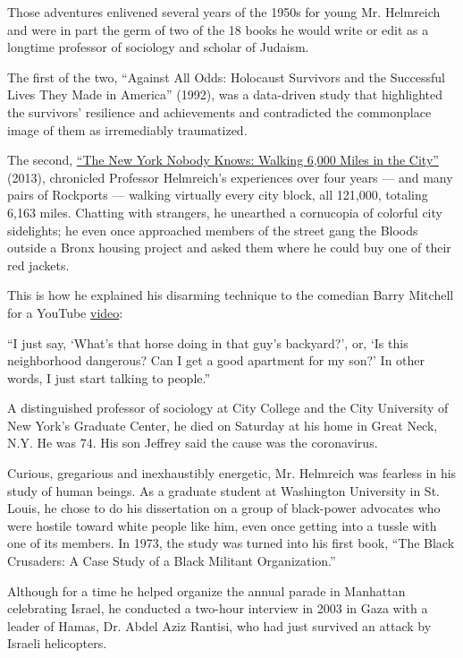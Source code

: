 Those adventures enlivened several years of the 1950s for young Mr.
Helmreich and were in part the germ of two of the 18 books he would
write or edit as a longtime professor of sociology and scholar of
Judaism.

The first of the two, ``Against All Odds: Holocaust Survivors and the
Successful Lives They Made in America'' (1992), was a data-driven study
that highlighted the survivors' resilience and achievements and
contradicted the commonplace image of them as irremediably traumatized.

The second,
\href{https://www.nytimes.com/2017/01/12/nyregion/brooklyn-nobody-knows-william-b-helmreich.html}{``The
New York Nobody Knows: Walking 6,000 Miles in the City''} (2013),
chronicled Professor Helmreich's experiences over four years --- and
many pairs of Rockports --- walking virtually every city block, all
121,000, totaling 6,163 miles. Chatting with strangers, he unearthed a
cornucopia of colorful city sidelights; he even once approached members
of the street gang the Bloods outside a Bronx housing project and asked
them where he could buy one of their red jackets.

This is how he explained his disarming technique to the comedian Barry
Mitchell for a YouTube
\href{https://www.youtube.com/watch?v=yQRiZP6jHFQ\&t=1s}{video}:

``I just say, `What's that horse doing in that guy's backyard?', or, `Is
this neighborhood dangerous? Can I get a good apartment for my son?' In
other words, I just start talking to people.''

A distinguished professor of sociology at City College and the City
University of New York's Graduate Center, he died on Saturday at his
home in Great Neck, N.Y. He was 74. His son Jeffrey said the cause was
the coronavirus.

Curious, gregarious and inexhaustibly energetic, Mr. Helmreich was
fearless in his study of human beings. As a graduate student at
Washington University in St. Louis, he chose to do his dissertation on a
group of black-power advocates who were hostile toward white people like
him, even once getting into a tussle with one of its members. In 1973,
the study was turned into his first book, ``The Black Crusaders: A Case
Study of a Black Militant Organization.''

Although for a time he helped organize the annual parade in Manhattan
celebrating Israel, he conducted a two-hour interview in 2003 in Gaza
with a leader of Hamas, Dr. Abdel Aziz Rantisi, who had just survived an
attack by Israeli helicopters.


